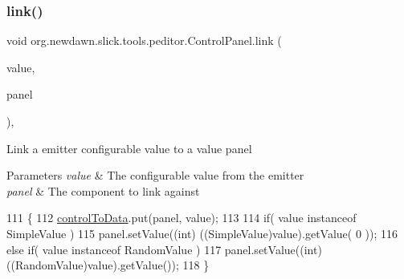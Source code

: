 \subsubsection{\texorpdfstring{link()}{link()}\hspace{0.1cm}{\footnotesize\ttfamily [3/4]}}
{\footnotesize\ttfamily void org.\+newdawn.\+slick.\+tools.\+peditor.\+Control\+Panel.\+link (\begin{DoxyParamCaption}\item[{\mbox{\hyperlink{interfaceorg_1_1newdawn_1_1slick_1_1particles_1_1_configurable_emitter_1_1_value}{Value}}}]{value,  }\item[{\mbox{\hyperlink{classorg_1_1newdawn_1_1slick_1_1tools_1_1peditor_1_1_value_panel}{Value\+Panel}}}]{panel }\end{DoxyParamCaption})\hspace{0.3cm}{\ttfamily [inline]}, {\ttfamily [private]}}

Link a emitter configurable value to a value panel


\begin{DoxyParams}{Parameters}
{\em value} & The configurable value from the emitter \\
\hline
{\em panel} & The component to link against \\
\hline
\end{DoxyParams}

\begin{DoxyCode}
111                                                      \{
112         \mbox{\hyperlink{classorg_1_1newdawn_1_1slick_1_1tools_1_1peditor_1_1_control_panel_a7316bd7b85c2e289dbafe9b65e33a474}{controlToData}}.put(panel, value);
113         
114         \textcolor{keywordflow}{if}( value instanceof SimpleValue )
115             panel.setValue((\textcolor{keywordtype}{int}) ((SimpleValue)value).getValue( 0 ));
116         \textcolor{keywordflow}{else} \textcolor{keywordflow}{if}( value instanceof RandomValue )
117             panel.setValue((\textcolor{keywordtype}{int}) ((RandomValue)value).getValue());
118     \}
\end{DoxyCode}
\mbox{\label{classorg_1_1newdawn_1_1slick_1_1tools_1_1peditor_1_1_control_panel_a4a70b9150db9b78be6708a393549efc3}} 
